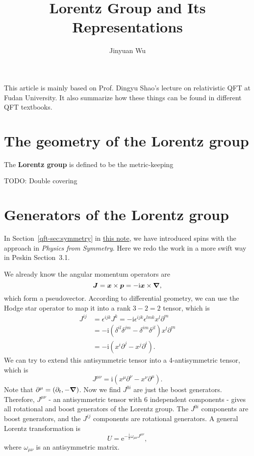 \documentclass[hyperref, a4paper]{article}
\title{Lorentz Group and Its Representations}
\author{Jinyuan Wu}
\newcommand*{\ii}{\mathrm{i}}
\newcommand*{\ee}{\mathrm{e}}
\newcommand*{\concept}[1]{{\textbf{#1}}}
\begin{document}
\maketitle

This article is mainly based on Prof. Dingyu Shao's lecture on relativistic QFT at Fudan University.
It also summarize how these things can be found in different QFT textbooks.

\section{The geometry of the Lorentz group}

The \concept{Lorentz group} is defined to be the metric-keeping   

TODO: Double covering

\section{Generators of the Lorentz group}

In Section~\ref{qft-sec:symmetry} in \href{../relativistic-qft/relativistic-qft.pdf}{this note}, we have 
introduced spins with the approach in \emph{Physics from Symmetry}. Here we redo the work in a more swift 
way in Peskin Section~3.1.

We already know the angular momentum operators are  
\begin{equation}
    \vb*{J} = \vb*{x} \times \vb*{p} = - \ii \vb*{x} \times \grad,
\end{equation}
which form a pseudovector. According to differential geometry, we can use the Hodge star operator to map it 
into a rank $3-2=2$ tensor, which is 
\begin{equation}
    \begin{aligned}
        J^{ij} &= \epsilon^{ijk} J^k = - \ii \epsilon^{ijk} \epsilon^{lmk} x^l \partial^m \\
        &= - \ii (\delta^{il} \delta^{jm} - \delta^{im} \delta^{jl}) x^l \partial^m \\
        &= - \ii (x^i \partial^j - x^j \partial^i).
    \end{aligned}
\end{equation}
We can try to extend this antisymmetric tensor into a 4-antisymmetric tensor, which is 
\begin{equation}
    J^{\mu \nu} = \ii (x^\mu \partial^\nu - x^\nu \partial^\mu).
    \label{eq:j-scalar-field}
\end{equation}
Note that $\partial^\mu = (\partial_t, - \grad)$. Now we find $J^{0 i}$ are just the boost generators.
Therefore, $J^{\mu \nu}$ - an antisymmetric tensor with 6 independent components - gives all rotational and 
boost generators of the Lorentz group. The $J^{0 i}$ components are boost generators, and the $J^{ij}$ 
components are rotational generators. A general Lorentz transformation is 
\begin{equation}
    U = \ee^{- \frac{\ii}{2} \omega_{\mu \nu} J^{\mu \nu}},
\end{equation}
where $\omega_{\mu \nu}$ is an antisymmetric matrix.
\end{document}

